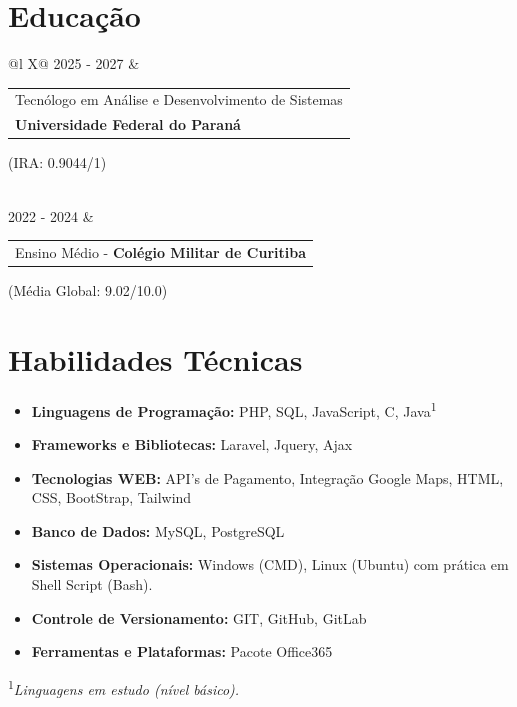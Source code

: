 \documentclass[a4paper,12pt]{article}
\begin{document}
\section{Educação}
\begin{tabularx}{\linewidth}{@{}l X@{}}
    2025 - 2027 & 
    \begin{tabular}[t]{@{}l@{}} 
        Tecnólogo em Análise e Desenvolvimento de Sistemas \\
        \textbf{Universidade Federal do Paraná}
    \end{tabular}
    \hfill \normalsize (IRA: 0.9044/1) \\
     \\

    \addlinespace[8pt]

    2022 - 2024 & 
    \begin{tabular}[t]{@{}l@{}}
        Ensino Médio - \textbf{Colégio Militar de Curitiba}
    \end{tabular}
    \hfill (Média Global: 9.02/10.0) \\
\end{tabularx}



\section{Habilidades Técnicas}
\begin{itemize}[noitemsep, nolistsep, leftmargin=*]
  \item \textbf{Linguagens de Programação:} PHP, SQL, JavaScript, C, Java\textsuperscript{1}
  \item \textbf{Frameworks e Bibliotecas:} Laravel, Jquery, Ajax
  \item \textbf{Tecnologias WEB:} API's de Pagamento, Integração Google Maps, HTML, CSS, BootStrap, Tailwind
  \item \textbf{Banco de Dados:} MySQL, PostgreSQL
  \item \textbf{Sistemas Operacionais:} Windows (CMD), Linux (Ubuntu) com prática em Shell Script (Bash).
  \item \textbf{Controle de Versionamento:} GIT, GitHub, GitLab
  \item \textbf{Ferramentas e Plataformas:} Pacote Office365
\end{itemize}
\textsuperscript{1}{\footnotesize\textit{Linguagens em estudo (nível básico).}}
\end{document}
